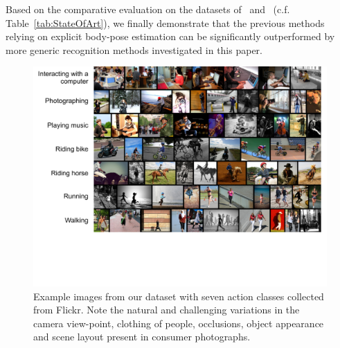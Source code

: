 \documentclass[extendedabs]{bmvc2k}
\newcommand{\red}[1]{{\em \small \color{red} #1}} %
\newcommand{\cfs}{\small}   %
\begin{document}
Based on the comparative evaluation on the datasets of~\cite{Gupta09} and~\cite{FeiFei10a} (c.f. Table~\ref{tab:StateOfArt}), we finally demonstrate that the previous methods relying on explicit body-pose estimation can be significantly outperformed by more generic recognition methods investigated in this paper.



\vspace{-1mm}

\begin{figure}[ht]
 \small
\includegraphics[width=.95\linewidth]{figs/my_dataset_cropped.pdf}
\vspace{-3mm}
\caption{\cfs Example images from our dataset with seven action classes collected from Flickr.
Note the natural and challenging variations in the camera view-point, clothing of people, occlusions, object appearance and scene layout present in consumer photographs.
 \normalsize
   }
 \label{fig:dataset}
\vspace{-2mm}
\end{figure}
\end{document}
